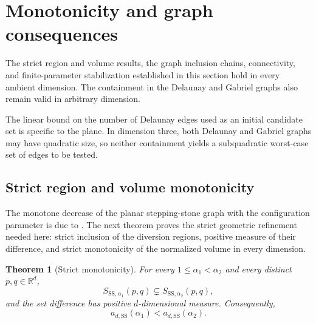 \documentclass[a4paper,fleqn]{cas-dc}
\newtheorem{theorem}{Theorem}
\theoremstyle{definition}
\theoremstyle{remark}
\newcommand{\R}{\mathds{R}}
\newcommand{\0}{\mathbf{0}}
\newcommand{\tb}[1]{\textcolor[HTML]{0000bb}{#1}}
\begin{document}
\section{Monotonicity and graph consequences}
\label{sec:monotonicity-graphs}



The strict region and volume results, the graph inclusion chains,
connectivity, and finite-parameter stabilization established in this section
hold in every ambient dimension. 
The containment in the Delaunay and Gabriel graphs also
remain valid in arbitrary dimension.

The linear bound on the number of Delaunay edges used as an initial
candidate set is specific to the plane. In dimension three, both Delaunay
and Gabriel graphs may have quadratic size, so neither containment yields a
subquadratic worst-case set of edges to be tested.


\subsection{Strict region and volume monotonicity}

The monotone decrease of the planar stepping-stone graph with the
configuration parameter is due to
\citet[Theorem~3.3]{kannangara2018stepping}. The next theorem proves the
strict geometric refinement needed here: strict inclusion of the diversion
regions, positive measure of their difference, and strict monotonicity of the
normalized volume in every dimension.


\begin{theorem}[Strict monotonicity]\label{thm:monotonicity}
For every $1\leq\alpha_1<\alpha_2$ and every distinct $p,q\in\R^d$,
\begin{equation}
S_{\mathrm{SS},\alpha_1}(p,q)
\subsetneq
S_{\mathrm{SS},\alpha_2}(p,q),
\end{equation}
and the set difference has positive $d$-dimensional measure. Consequently,
\begin{equation}
 a_{d,\mathrm{SS}}(\alpha_1)<a_{d,\mathrm{SS}}(\alpha_2).
\end{equation}
\end{theorem}
\end{document}
